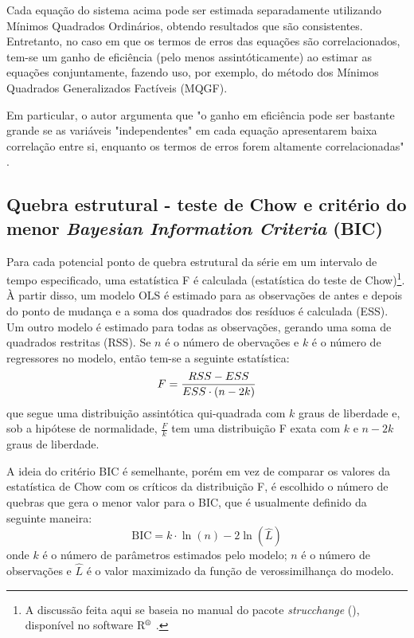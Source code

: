 \documentclass[12pt, openright,oneside, a4paper, english, brazil, section = TITLE, ubsection = Title]{article}
\begin{document}
Cada equação do sistema acima pode ser estimada separadamente utilizando Mínimos Quadrados Ordinários, obtendo resultados que são consistentes. Entretanto, no caso em que os termos de erros das equações são correlacionados, tem-se um ganho de eficiência (pelo menos assintóticamente) ao estimar as equações conjuntamente, fazendo uso, por exemplo, do método dos Mínimos Quadrados Generalizados Factíveis (MQGF).

Em particular, o autor argumenta que "o ganho em eficiência pode ser bastante grande se as variáveis "independentes" em cada equação apresentarem baixa correlação entre si, enquanto os termos de erros forem altamente correlacionadas"\, \cite[p.~3, tradução nossa]{Zellner1962}.

\subsection{Quebra estrutural - teste de Chow e critério do menor \textit{Bayesian Information Criteria} (BIC)}

Para cada potencial ponto de quebra estrutural da série em um intervalo de tempo especificado, uma estatística F é calculada (estatística do teste de Chow)\footnote{
A discussão feita aqui se baseia no manual do pacote \textit{strucchange} (), disponível no software R$^\text{\textregistered}$ \cite{R2020}. }. À partir disso, um modelo OLS é estimado para as observações de antes e depois do ponto de mudança e a soma dos quadrados dos resíduos é calculada (ESS). Um outro modelo é estimado para todas as observações, gerando uma soma de quadrados restritas (RSS). Se $n$ é o número de obervações e $k$ é o número de regressores no modelo, então tem-se a seguinte estatística:
\begin{equation} \scriptsize
F = \frac{RSS - ESS}{ESS \cdot (n - 2k)}
\end{equation}
que segue uma distribuição assintótica qui-quadrada com $k$ graus de liberdade e, sob a hipótese de normalidade, $\frac{F}{k}$ tem uma distribuição F exata com $k$ e $n-2k$ graus de liberdade.

A ideia do critério BIC é semelhante, porém em vez de comparar os valores da estatística de Chow com os críticos da distribuição F, é escolhido o número de quebras que gera o menor valor para o BIC, que é usualmente definido da seguinte maneira:
\begin{equation}
\text{BIC} = k \cdot \ln(n) - 2\ln(\hat{L})
\end{equation}
onde $k$ é o número de parâmetros estimados pelo modelo; $n$ é o número de observações e $\hat{L}$ é o valor maximizado da função de verossimilhança do modelo.
\end{document}
